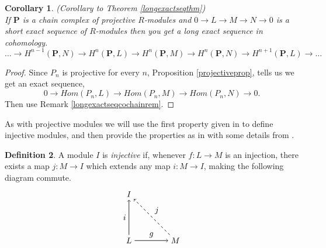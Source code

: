 \documentclass[11.5pt, twoside, a4paper, titlepage]{report}
\theoremstyle{definition}
\newtheorem{mydef}{Definition}[section]
\theoremstyle{plain}
\newtheorem{cor}[mydef]{Corollary}
\begin{document}
\begin{cor} \label{longexactseqcor}(Corollary to Theorem \ref{longexactseqthm})\\
If $\mathbf{P}$ is a chain complex of projective $R$-modules and $0\xrightarrow{}L\xrightarrow{}M\xrightarrow{}N\xrightarrow{}0$ is a short exact sequence of $R$-modules then you get a long exact sequence in cohomology.
\begin{equation*}
\dots \xrightarrow{} H^{n-1}(\mathbf{P}, N) \xrightarrow{} H^n(\mathbf{P}, L) \xrightarrow{} H^n(\mathbf{P}, M) \xrightarrow{} H^n(\mathbf{P}, N) \xrightarrow{} H^{n+1}(\mathbf{P}, L) \xrightarrow{} \dots
\end{equation*}
\end{cor}
\begin{proof}
Since $P_n$ is projective for every $n$, Proposition \ref{projectiveprop}, tells us we get an exact sequence,
\begin{equation*}
0\xrightarrow{} Hom(P_n, L) \xrightarrow{} Hom(P_n, M) \xrightarrow{} Hom(P_n, N) \xrightarrow{} 0.
\end{equation*}
Then use Remark \ref{longexactseqcochainrem}.
\end{proof}

As with projective modules we will use the first property given in \cite{CB1} to define injective modules, and then provide the properties as in \cite{CB1} with some details from \cite{Rotman}.

\begin{mydef}
A module $I$ is \emph{injective} if, whenever $f: L \to M$ is an injection, there exists a map $j: M \to I$ which extends any map $i: M \to I$, making the following diagram commute.
\begin{equation*}
\begin{tikzpicture}[->,-latex, auto, main path/.style={->, semithick}, main node/.style={}]
\node	[main node]		(1) at (0,0)		{$L$};
\node	[main node]		(2) at (2,0)		{$M$};
\node [main node]		(3) at (0,2)		{$I$};

\draw (1) edge [main path] node [auto] {$g$} (2);
\draw (1) edge [main path] node [auto] {$i$} (3);
\draw (2) edge [dashed, ->, semithick] node [auto, swap] {$j$} (3);
\end{tikzpicture}
\end{equation*}
\end{mydef}
\end{document}
